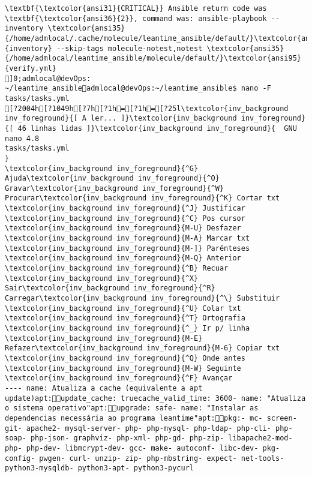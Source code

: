 \documentclass{scrartcl}
\begin{document}
\begin{Verbatim}
\textbf{\textcolor{ansi31}{CRITICAL}} Ansible return code was \textbf{\textcolor{ansi36}{2}}, command was: ansible-playbook --inventory \textcolor{ansi35}{/home/admlocal/.cache/molecule/leantime_ansible/default/}\textcolor{ansi95}{inventory} --skip-tags molecule-notest,notest \textcolor{ansi35}{/home/admlocal/leantime_ansible/molecule/default/}\textcolor{ansi95}{verify.yml}
]0;admlocal@devOps: ~/leantime_ansibleadmlocal@devOps:~/leantime_ansible$ nano -F tasks/tasks.yml 
[?2004h[?1049h[?7h[?1h=[?1h=[?25l\textcolor{inv_background inv_foreground}{[ A ler... ]}\textcolor{inv_background inv_foreground}{[ 46 linhas lidas ]}\textcolor{inv_background inv_foreground}{  GNU nano 4.8                                                                          tasks/tasks.yml                                                                                      }
\textcolor{inv_background inv_foreground}{^G} Ajuda\textcolor{inv_background inv_foreground}{^O} Gravar\textcolor{inv_background inv_foreground}{^W} Procurar\textcolor{inv_background inv_foreground}{^K} Cortar txt    \textcolor{inv_background inv_foreground}{^J} Justificar    \textcolor{inv_background inv_foreground}{^C} Pos cursor    \textcolor{inv_background inv_foreground}{M-U} Desfazer     \textcolor{inv_background inv_foreground}{M-A} Marcar txt   \textcolor{inv_background inv_foreground}{M-]} Parênteses   \textcolor{inv_background inv_foreground}{M-Q} Anterior     \textcolor{inv_background inv_foreground}{^B} Recuar
\textcolor{inv_background inv_foreground}{^X} Sair\textcolor{inv_background inv_foreground}{^R} Carregar\textcolor{inv_background inv_foreground}{^\} Substituir    \textcolor{inv_background inv_foreground}{^U} Colar txt     \textcolor{inv_background inv_foreground}{^T} Ortografia    \textcolor{inv_background inv_foreground}{^_} Ir p/ linha   \textcolor{inv_background inv_foreground}{M-E} Refazer\textcolor{inv_background inv_foreground}{M-6} Copiar txt   \textcolor{inv_background inv_foreground}{^Q} Onde antes    \textcolor{inv_background inv_foreground}{M-W} Seguinte     \textcolor{inv_background inv_foreground}{^F} Avançar
---- name: Atualiza a cache (equivalente a apt update)apt:update_cache: truecache_valid_time: 3600- name: "Atualiza o sistema operativo"apt:upgrade: safe- name: "Instalar as dependencias necessária ao programa leantime"apt:pkg:- mc- screen- git- apache2- mysql-server- php- php-mysql- php-ldap- php-cli- php-soap- php-json- graphviz- php-xml- php-gd- php-zip- libapache2-mod-php- php-dev- libmcrypt-dev- gcc- make- autoconf- libc-dev- pkg-config- pwgen- curl- unzip- zip- php-mbstring- expect- net-tools- python3-mysqldb- python3-apt- python3-pycurl

\end{Verbatim}
\end{document}
